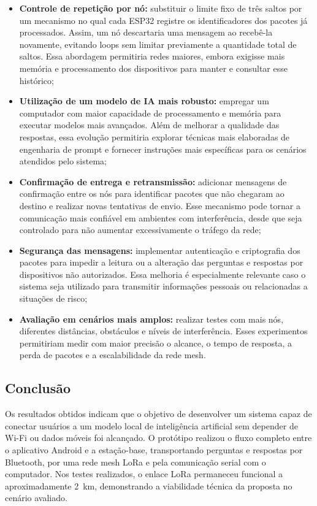 \documentclass[12pt]{article}
\begin{document}
\begin{itemize}
    \item \textbf{Controle de repetição por nó:} substituir o limite fixo de três saltos por um mecanismo no qual cada ESP32 registre os identificadores dos pacotes já processados. Assim, um nó descartaria uma mensagem ao recebê-la novamente, evitando loops sem limitar previamente a quantidade total de saltos. Essa abordagem permitiria redes maiores, embora exigisse mais memória e processamento dos dispositivos para manter e consultar esse histórico;

    \item \textbf{Utilização de um modelo de IA mais robusto:} empregar um computador com maior capacidade de processamento e memória para executar modelos mais avançados. Além de melhorar a qualidade das respostas, essa evolução permitiria explorar técnicas mais elaboradas de engenharia de prompt e fornecer instruções mais específicas para os cenários atendidos pelo sistema;

    \item \textbf{Confirmação de entrega e retransmissão:} adicionar mensagens de confirmação entre os nós para identificar pacotes que não chegaram ao destino e realizar novas tentativas de envio. Esse mecanismo pode tornar a comunicação mais confiável em ambientes com interferência, desde que seja controlado para não aumentar excessivamente o tráfego da rede;

    \item \textbf{Segurança das mensagens:} implementar autenticação e criptografia dos pacotes para impedir a leitura ou a alteração das perguntas e respostas por dispositivos não autorizados. Essa melhoria é especialmente relevante caso o sistema seja utilizado para transmitir informações pessoais ou relacionadas a situações de risco;

    \item \textbf{Avaliação em cenários mais amplos:} realizar testes com mais nós, diferentes distâncias, obstáculos e níveis de interferência. Esses experimentos permitiriam medir com maior precisão o alcance, o tempo de resposta, a perda de pacotes e a escalabilidade da rede mesh.
\end{itemize}

\subsection{Conclusão}

Os resultados obtidos indicam que o objetivo de desenvolver um sistema capaz de conectar usuários a um modelo local de inteligência artificial sem depender de Wi-Fi ou dados móveis foi alcançado. O protótipo realizou o fluxo completo entre o aplicativo Android e a estação-base, transportando perguntas e respostas por Bluetooth, por uma rede mesh LoRa e pela comunicação serial com o computador. Nos testes realizados, o enlace LoRa permaneceu funcional a aproximadamente 2~km, demonstrando a viabilidade técnica da proposta no cenário avaliado.
\end{document}
